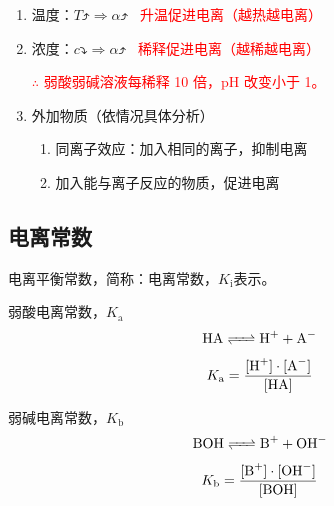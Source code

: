             \begin{enumerate}
                \item 温度：\(T\uprightcurvearrow \Rightarrow \alpha\uprightcurvearrow\)
                \ \phantom{\(c\)}\textcolor{red}{升温促进电离（越热越电离）}
                \item 浓度：\(c\downrightcurvedarrow \Rightarrow \alpha\uprightcurvearrow\)
                \ \phantom{\(T\)}\textcolor{red}{稀释促进电离（越稀越电离）}
                
                    \textcolor{red}{\(\therefore\) 弱酸弱碱溶液每稀释 10 倍，pH 改变小于 1。}

                \item 外加物质（依情况具体分析）
                \begin{enumerate}
                    \item 同离子效应：加入相同的离子，抑制电离
                    \item 加入能与离子反应的物质，促进电离
                \end{enumerate}
            \end{enumerate}

    \subsection{电离常数}\label{subsec:电离常数}

        电离平衡常数，简称：电离常数，\(K_\text{i}\)表示。
        
        \vspace{0.2\baselineskip}
        \begin{minipage}{0.45\textwidth}
            \centering
            弱酸电离常数，\(K_\text{a}\)
            \vspace{-0.5\baselineskip}
            \[\cemh{HA <=> H+ + A-}\]
            \vspace{-\baselineskip}
            \[K_\text{a}=\frac{\cemh{[H+]}\cdot\cemh{[A^-]}}{\cemh{[HA]}}\]
        \end{minipage}
        \hfil
        \begin{minipage}{0.45\textwidth}
            \centering
            弱碱电离常数，\(K_\text{b}\)
            \vspace{-0.5\baselineskip}
            \[\cemh{BOH <=> B+ + OH^-}\]
            \vspace{-\baselineskip}
            \[K_\text{b}=\frac{\cemh{[B+]}\cdot\cemh{[OH^-]}}{\cemh{[BOH]}}\]
        \end{minipage}
        
